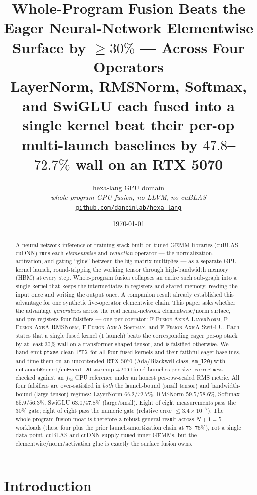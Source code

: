 \documentclass[11pt,a4paper]{article}
\title{
  \textbf{Whole-Program Fusion Beats the Eager Neural-Network
  Elementwise Surface by $\ge 30\%$ --- Across Four Operators}\\[4pt]
  \large LayerNorm, RMSNorm, Softmax, and SwiGLU each fused into a
  single kernel beat their per-op multi-launch baselines by
  $47.8$--$72.7\%$ wall on an RTX 5070
}
\author{
  hexa-lang GPU domain\\
  \normalsize\textit{whole-program GPU fusion, no LLVM, no cuBLAS}\\[2pt]
  \normalsize\href{https://github.com/dancinlab/hexa-lang}{\texttt{github.com/dancinlab/hexa-lang}}
}
\date{\today}
\newcommand{\fln}{\textsc{F-Fusion-AxisA-LayerNorm}}
\newcommand{\frms}{\textsc{F-Fusion-AxisA-RMSNorm}}
\newcommand{\fsm}{\textsc{F-Fusion-AxisA-Softmax}}
\newcommand{\fswi}{\textsc{F-Fusion-AxisA-SwiGLU}}
\begin{document}
\maketitle

\begin{abstract}
A neural-network inference or training stack built on tuned GEMM libraries
(cuBLAS, cuDNN) runs each \emph{elementwise} and \emph{reduction} operator ---
the normalization, activation, and gating ``glue'' between the big matrix
multiplies --- as a separate GPU kernel launch, round-tripping the working
tensor through high-bandwidth memory (HBM) at every step. Whole-program fusion
collapses an entire such sub-graph into a single kernel that keeps the
intermediates in registers and shared memory, reading the input once and
writing the output once. A companion result already established this advantage
for one synthetic five-operator elementwise chain. This paper asks whether the
advantage \emph{generalizes} across the real neural-network elementwise/norm
surface, and pre-registers four falsifiers --- one per operator: \fln,
\frms, \fsm, and \fswi. Each states that a single fused kernel (1 launch) beats
the corresponding eager per-op stack by at least $30\%$ wall on a
transformer-shaped tensor, and is falsified otherwise. We hand-emit
\texttt{ptxas}-clean PTX for all four fused kernels and their faithful eager
baselines, and time them on an uncontended RTX 5070 (Ada/Blackwell-class,
\texttt{sm\_120}) with \texttt{cuLaunchKernel}/\texttt{cuEvent},
$20$ warmup $+ 200$ timed launches per size, correctness checked against an
$f_{64}$ CPU reference under an honest per-row-scaled RMS metric. All four
falsifiers are over-satisfied in \emph{both} the launch-bound (small tensor)
and bandwidth-bound (large tensor) regimes: LayerNorm $66.2/72.7\%$,
RMSNorm $59.5/58.6\%$, Softmax $65.9/56.3\%$, SwiGLU $63.0/47.8\%$
(large/small). Eight of eight measurements pass the $30\%$ gate; eight of eight
pass the numeric gate (relative error $\le 3.4\times 10^{-7}$). The whole-program
fusion moat is therefore a robust general result across $N+1=5$ workloads
(these four plus the prior launch-amortization chain at $73$--$76\%$), not a
single data point. cuBLAS and cuDNN supply tuned inner GEMMs, but the
elementwise/norm/activation glue is exactly the surface fusion owns.
\end{abstract}

\section{Introduction}
\label{sec:intro}
\end{document}
